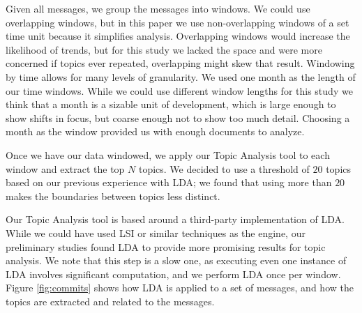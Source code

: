 \documentclass[times, 10pt,twocolumn]{article}
\newcommand{\shrinkit}{\vspace*{-.3em}}
\begin{document}

\shrinkit
{}
\shrinkit


Given all messages, we group the messages into windows. We could use
overlapping windows, but in this paper we use non-overlapping windows
of a set time unit because it simplifies analysis.  
Overlapping windows would 
increase the likelihood of trends, 
but for this
study we lacked the space and were more concerned if topics ever
repeated, overlapping might skew that result.
Windowing by time
allows for many levels of granularity.  
We used one month as the
length of our time windows. While we could use different window
lengths for this study we think that a month is a sizable unit of
development, which is large enough to show shifts in focus, but coarse
enough not to show too much detail. Choosing a month as the window
provided us with enough documents to analyze. 


\shrinkit
{}
\shrinkit

Once we have our data windowed, we apply our Topic Analysis tool to
each window and extract the top $N$ topics.  We decided to use a
threshold of $20$ topics based on our previous experience with LDA; we
found that using more than $20$ makes the boundaries between topics less
distinct.


Our Topic Analysis tool is based around a third-party implementation
of LDA.  While we could have used LSI or similar techniques as the
engine, our preliminary studies found LDA to provide more promising
results for topic analysis.  We note that this step is a slow one, as
executing even one instance of LDA involves significant computation,
and we perform LDA once per window.  Figure \ref{fig:commits} shows
how LDA is applied to a set of messages, and how the topics are
extracted and related to the messages.





\shrinkit
{}
\shrinkit
\end{document}
